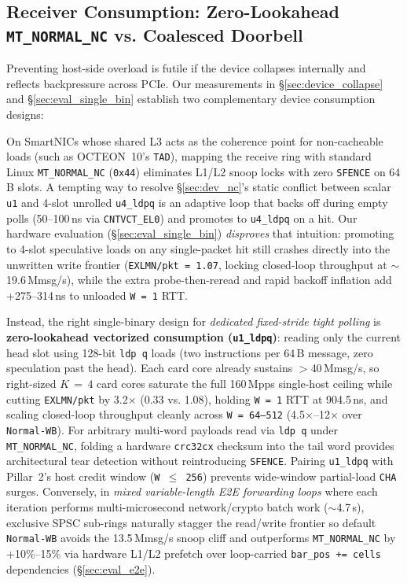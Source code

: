 \subsection{Receiver Consumption: Zero-Lookahead \texttt{MT\_NORMAL\_NC} vs. Coalesced Doorbell}
\label{sec:design_rx}

Preventing host-side overload is futile if the device collapses internally and reflects backpressure across PCIe. Our measurements in \S\ref{sec:device_collapse} and \S\ref{sec:eval_single_bin} establish two complementary device consumption designs:

On SmartNICs whose shared L3 acts as the coherence point for non-cacheable loads (such as OCTEON~10's \texttt{TAD}), mapping the receive ring with standard Linux \texttt{MT\_NORMAL\_NC} (\texttt{0x44}) eliminates L1/L2 snoop locks with zero \texttt{SFENCE} on 64\,B slots. A tempting way to resolve \S\ref{sec:dev_nc}'s static conflict between scalar \texttt{u1} and 4-slot unrolled \texttt{u4\_ldpq} is an adaptive loop that backs off during empty polls (50--100\,ns via \texttt{CNTVCT\_EL0}) and promotes to \texttt{u4\_ldpq} on a hit. Our hardware evaluation (\S\ref{sec:eval_single_bin}) \emph{disproves} that intuition: promoting to 4-slot speculative loads on any single-packet hit still crashes directly into the unwritten write frontier (\texttt{EXLMN/pkt\,=\,1.07}, locking closed-loop throughput at $\sim$19.6\,Mmsg/s), while the extra probe-then-reread and rapid backoff inflation add +275--314\,ns to unloaded \texttt{W\,=\,1} RTT.

Instead, the right single-binary design for \emph{dedicated fixed-stride tight polling} is \textbf{zero-lookahead vectorized consumption (\texttt{u1\_ldpq})}: reading only the current head slot using 128-bit \texttt{ldp q} loads (two instructions per 64\,B message, zero speculation past the head). Each card core already sustains $>$40\,Mmsg/s, so right-sized $K\,=\,4$ card cores saturate the full 160\,Mpps single-host ceiling while cutting \texttt{EXLMN/pkt} by 3.2$\times$ (0.33 vs. 1.08), holding \texttt{W\,=\,1} RTT at 904.5\,ns, and scaling closed-loop throughput cleanly across \texttt{W\,=\,64--512} (4.5$\times$--12$\times$ over \texttt{Normal-WB}). For arbitrary multi-word payloads read via \texttt{ldp q} under \texttt{MT\_NORMAL\_NC}, folding a hardware \texttt{crc32cx} checksum into the tail word provides architectural tear detection without reintroducing \texttt{SFENCE}. Pairing \texttt{u1\_ldpq} with Pillar~2's host credit window (\texttt{W\,$\le$\,256}) prevents wide-window partial-load \texttt{CHA} surges. Conversely, in \emph{mixed variable-length E2E forwarding loops} where each iteration performs multi-microsecond network/crypto batch work ($\sim$4.7\,\textmu s), exclusive SPSC sub-rings naturally stagger the read/write frontier so default \texttt{Normal-WB} avoids the 13.5\,Mmsg/s snoop cliff and outperforms \texttt{MT\_NORMAL\_NC} by +10\%--15\% via hardware L1/L2 prefetch over loop-carried \texttt{bar\_pos += cells} dependencies (\S\ref{sec:eval_e2e}).

